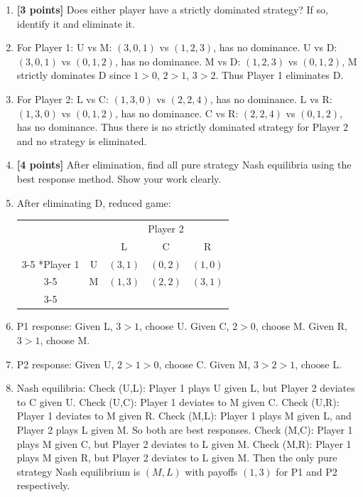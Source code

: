 \documentclass[11pt]{article}
\begin{document}
\begin{enumerate}[label=(\alph*)]
    \item \textbf{[3 points]} Does either player have a strictly dominated strategy? If so, identify it and eliminate it.
        \item[] For Player 1: U vs M: $(3,0,1)$ vs $(1,2,3)$, has no dominance. U vs D: $(3,0,1)$ vs $(0,1,2)$, has no dominance. M vs D: $(1,2,3)$ vs $(0,1,2)$, M strictly dominates D since $1>0$, $2>1$, $3>2$. Thus Player 1 eliminates D. 
        \item[] For Player 2: L vs C: $(1,3,0)$ vs $(2,2,4)$, has no dominance. L vs R: $(1,3,0)$ vs $(0,1,2)$, has no dominance. C vs R: $(2,2,4)$ vs $(0,1,2)$, has no dominance. Thus there is no strictly dominated strategy for Player 2 and no strategy is eliminated.

    
    \item \textbf{[4 points]} After elimination, find all pure strategy Nash equilibria using the best response method. Show your work clearly.
    \item[] After eliminating D, reduced game:
    
\begin{center}
\begin{tabular}{cc|c|c|c|}
 & \multicolumn{1}{c}{} & \multicolumn{3}{c}{Player 2}\\
 & \multicolumn{1}{c}{} & \multicolumn{1}{c}{L} & \multicolumn{1}{c}{C} & \multicolumn{1}{c}{R} \\\cline{3-5}
\multirow{2}*{Player 1} & U & $(3, 1)$ & $(0, 2)$ & $(1, 0)$ \\\cline{3-5}
 & M & $(1, 3)$ & $(2, 2)$ & $(3, 1)$ \\\cline{3-5}
\end{tabular}
\end{center}
    
    \item[] P1 response: Given L, $3>1$, choose U. Given C, $2>0$, choose M. Given R, $3>1$, choose M. 
    \item[] P2 response: Given U, $2>1>0$, choose C. Given M, $3>2>1$, choose L. 
    \item[] Nash equilibria: Check (U,L): Player 1 plays U given L, but Player 2 deviates to C given U. Check (U,C): Player 1 deviates to M given C. Check (U,R): Player 1 deviates to M given R. Check (M,L): Player 1 plays M given L, and Player 2 plays L given M. So both are best responses. Check (M,C): Player 1 plays M given C, but Player 2 deviates to L given M. Check (M,R): Player 1 plays M given R, but Player 2 deviates to L given M. Then the only pure strategy Nash equilibrium is $(M,L)$ with payoffs $(1,3)$ for P1 and P2 respectively.
    

\end{enumerate}
\end{document}
